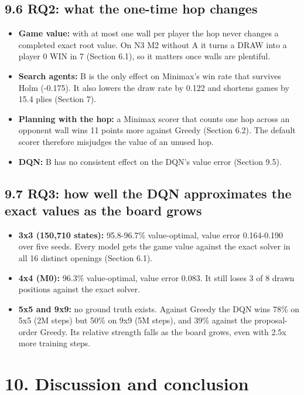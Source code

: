 \documentclass[11pt]{article}
\begin{document}
\subsection{9.6 RQ2: what the one-time hop changes}

\begin{itemize}
\item \textbf{Game value:} with at most one wall per player the hop never changes a completed exact root
value.
On N3 M2 without A it turns a DRAW into a player 0 WIN in 7 (Section 6.1), so it matters once
walls are plentiful.
\item \textbf{Search agents:} B is the only effect on Minimax's win rate that survives Holm (-0.175).
It also lowers the draw rate by 0.122 and shortens games by 15.4 plies (Section 7).
\item \textbf{Planning with the hop:} a Minimax scorer that counts one hop across an opponent wall wins
11 points more against Greedy (Section 6.2). The default scorer therefore misjudges the value
of an unused hop.
\item \textbf{DQN:} B has no consistent effect on the DQN's value error (Section 9.5).
\end{itemize}

\subsection{9.7 RQ3: how well the DQN approximates the exact values as the board grows}

\begin{itemize}
\item \textbf{3x3 (150,710 states):} 95.8-96.7\% value-optimal, value error 0.164-0.190 over five seeds.
Every model gets the game value against the exact solver in all 16 distinct openings
(Section 6.1).
\item \textbf{4x4 (M0):} 96.3\% value-optimal, value error 0.083. It still loses 3 of 8 drawn positions
against the exact solver.
\item \textbf{5x5 and 9x9:} no ground truth exists. Against Greedy the DQN wins 78\% on 5x5 (2M steps) but
50\% on 9x9 (5M steps), and 39\% against the proposal-order Greedy. Its relative strength falls as
the board grows, even with 2.5x more training steps.
\end{itemize}

\section{10. Discussion and conclusion}
\end{document}
